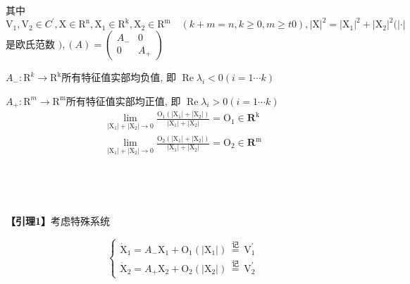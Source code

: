 \documentclass[12pt,a4paper,UTF8]{ctexart}
\begin{document}
其中 $ \mathrm{V}_{1}, \mathrm{V}_{2} \in C^{\prime}, \mathrm{X} \in \mathrm{R}^{\mathrm{n}}, \mathrm{X}_{1} \in \mathrm{R}^{\mathrm{k}}, \mathrm{X}_{2} \in \mathrm{R}^{\mathrm{m}} \quad(k+m=n, k \geq 0, m \geq t 0),|\mathrm{X}|^{2}=   \left|\mathrm{X}_{1}\right|^{2}+\left|\mathrm{X}_{2}\right|^{2}(| \cdot| $  是欧氏范数 $ ) ,(A)=\left(\begin{array}{cc}A_{-} & 0 \\ 0 & A_{+}\end{array}\right) $

$A_{-}: \mathrm{R}^{k} \rightarrow \mathrm{R}^{\mathrm{k}}  $所有特征值实部均负值, 即  $\operatorname{Re} \lambda_{i}<0(i=1 \cdots k) $

$A_{+}: \mathrm{R}^{m} \rightarrow \mathrm{R}^{\mathrm{m}}  $所有特征值实部均正值, 即  $\operatorname{Re} \lambda_{i}>0(i=1 \cdots k) $
\begin{equation*}
\begin{aligned}
	\lim _{|\mathrm{X}_1|+|\mathrm{X}_2| \rightarrow 0} \frac{\mathrm{O}_{1}\left(\left|\mathrm{X}_{1}\right|+\left|\mathrm{X}_{2}\right|\right)}{\left|\mathrm{X}_{1}\right|+\left|\mathrm{X}_{2}\right|}=\mathrm{O}_{1} \in \mathbf{R}^{\mathrm{k}} \\
    \lim _{|\mathrm{X}_1|+|\mathrm{X}_2| \rightarrow 0} \frac{\mathrm{O}_{2}\left(\left|\mathrm{X}_{1}\right|+\left|\mathrm{X}_{2}\right|\right)}{\left|\mathrm{X}_{1}\right|+\left|\mathrm{X}_{2}\right|}=\mathrm{O}_{2} \in \mathbf{R}^{\mathrm{m}} 
\end{aligned}
\end{equation*}





\begin{spacing}{0.9}
	~
\end{spacing}
\begin{spacing}{0.8}
		~
\end{spacing}

\textbf{【引理1】}考虑特殊系统

\begin{equation}
	\left\{\begin{array}{l}
		\dot{\mathrm{X}}_{1}=A_{-} \mathrm{X}_{1}+\mathrm{O}_{1}\left(\left|\mathrm{X}_{1}\right|\right) \stackrel{\text { 记 }}{=} \mathrm{V}_{1}^{\prime} \\
		\dot{\mathrm{X}}_{2}=A_{+} \mathrm{X}_{2}+\mathrm{O}_{2}\left(\left|\mathrm{X}_{2}\right|\right) \stackrel{\text { 记 }}{=} \mathrm{V}_{2}^{\prime}
	\end{array}\right.
\end{equation}
\end{document}
